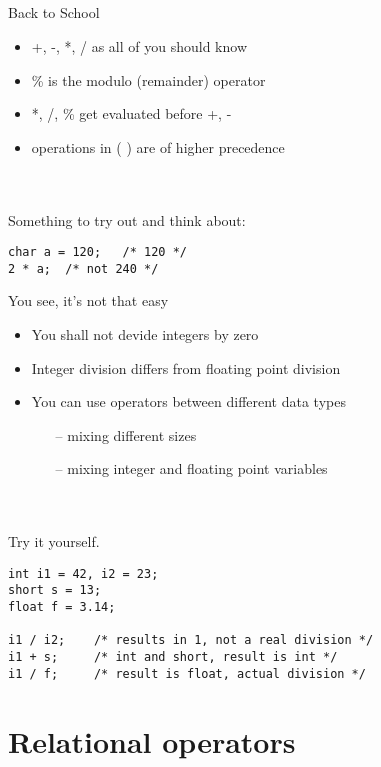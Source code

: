 \subsection{}
\begin{frame}[fragile]{Back to School}
	\begin{itemize}
		\item +, -, *, / as all of you should know
		\item \% is the modulo (remainder) operator
		\item *, /, \% get evaluated before +, -
		\item operations in (  ) are of higher precedence
	\end{itemize}
	\ \\\ \\Something to try out and think about:
	\begin{lstlisting}[numbers=none]
char a = 120;	/* 120 */
2 * a;	/* not 240 */
\end{lstlisting}
\end{frame}
\begin{frame}[fragile]{You see, it's not that easy}
	\begin{itemize}
		\item You shall not devide integers by zero
		\item Integer division differs from floating point division
		\item You can use operators between different data types
		\begin{itemize}
			\item[--] mixing different sizes
			\item[--] mixing integer and floating point variables
		\end{itemize}
	\end{itemize}
	\ \\\ \\Try it yourself.
	\begin{lstlisting}[numbers=none]
int i1 = 42, i2 = 23;
short s = 13;
float f = 3.14;

i1 / i2;	/* results in 1, not a real division */
i1 + s;		/* int and short, result is int */
i1 / f;		/* result is float, actual division */
\end{lstlisting}
\end{frame}
\section{Relational operators}
